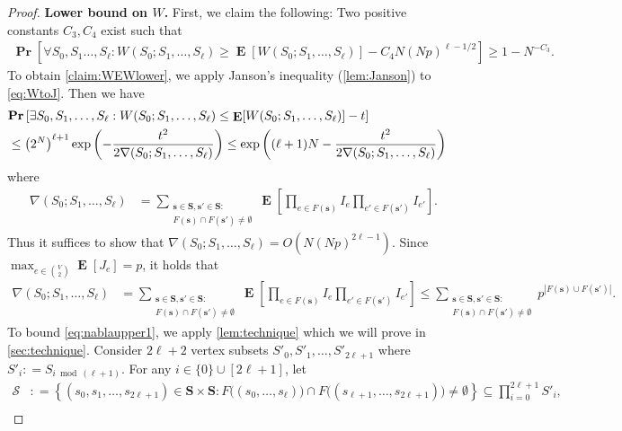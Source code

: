 \documentclass[letterpaper,11pt]{article}
\newcommand{\Ind}{I}
\newcommand{\Vsize}{N}
\newcommand{\pmax}{p}
\newcommand{\Slc}{\mathbf{S}}
\newcommand{\Es}{F}
\renewcommand\Pr{\mathop{\mathbf{Pr}}}
\DeclareMathOperator{\E}{\mathbf{E}}
\def\defeq{\mathrel{\mathop:}=}%
\begin{document}
\begin{proof}
\noindent \textbf{Lower bound on $W$. } 
First, we claim the following:
Two positive constants $C_3, C_4$ exist such that
\begin{align}
\Pr\left[\forall S_0, S_1\ldots, S_\ell: W(S_0;S_1,\ldots, S_\ell)\geq \E[W(S_0;S_1,\ldots, S_\ell)]-C_4 \Vsize (\Vsize \pmax)^{\ell-1/2}  \right]\geq 1-\Vsize^{-C_3}.
\label{claim:WEWlower}
\end{align}
To obtain \cref{claim:WEWlower}, we apply Janson's inequality (\cref{lem:Janson}) to \cref{eq:WtoJ}.
Then we have
\begin{align}
\lefteqn{\Pr\left[\exists S_0,S_1,\ldots, S_\ell: W(S_0;S_1,\ldots,S_\ell)\leq \E[W(S_0;S_1,\ldots,S_\ell)]-t\right]} \nonumber \\
&\leq \left(2^\Vsize\right)^{\ell+1}\exp\left(-\frac{t^2}{2\nabla(S_0;S_1,\ldots,S_\ell)}\right)
\leq \exp\left((\ell+1)\Vsize-\frac{t^2}{2\nabla(S_0;S_1,\ldots,S_\ell)}\right)
\label{eq:WJansonwithNabla}
\end{align}
where
\begin{align*}
\nabla(S_0;S_1,\ldots,S_\ell)
&= \sum_{\substack{\mathbf{s}\in \Slc,\mathbf{s}'\in \Slc:\\\Es(\mathbf{s})\cap \Es(\mathbf{s}')\neq \emptyset}}
\E\left[\prod_{e\in \Es(\mathbf{s})} \Ind_{e}\prod_{e'\in \Es(\mathbf{s}')} \Ind_{e'}\right].
\end{align*}
Thus it suffices to show that
$
\nabla(S_0;S_1,\ldots,S_\ell)
= O(\Vsize (\Vsize \pmax)^{2\ell-1})
$.
Since $\max_{e\in \binom{V}{2}}\E[J_e]=\pmax$, it holds that
\begin{align}
\nabla(S_0;S_1,\ldots,S_\ell)
&=\sum_{\substack{\mathbf{s}\in \Slc,\mathbf{s}'\in \Slc:\\\Es(\mathbf{s})\cap \Es(\mathbf{s}')\neq \emptyset}}
\E\left[\prod_{e\in \Es(\mathbf{s})} \Ind_{e}\prod_{e'\in \Es(\mathbf{s}')} \Ind_{e'}\right]
\leq \sum_{\substack{\mathbf{s}\in \Slc,\mathbf{s}'\in \Slc:\\\Es(\mathbf{s})\cap \Es(\mathbf{s}')\neq \emptyset}}
p^{|\Es(\mathbf{s})\cup \Es(\mathbf{s}')|}. 
\label{eq:nablaupper1}
\end{align}
To bound \cref{eq:nablaupper1}, we apply \cref{lem:technique} which we will prove in \cref{sec:technique}.
%
Consider $2\ell+2$ vertex subsets $S'_0, S'_1, \ldots, S'_{2\ell+1}$ where $S'_i\defeq S_{i\bmod (\ell+1)}$.
For any $i\in \{0\}\cup [2\ell+1]$, let 
\begin{align*}
\mathcal{S}&\defeq \left\{ (s_0, s_1, \ldots, s_{2\ell+1})\in \Slc\times \Slc : \Es\bigl((s_0, \ldots, s_{\ell})\bigr)\cap \Es\bigl((s_{\ell+1},\ldots, s_{2\ell+1})\bigr)\neq \emptyset \right\}\subseteq \prod_{i=0}^{2\ell+1}S'_i, \\

\end{align*}
\end{proof}
\end{document}
